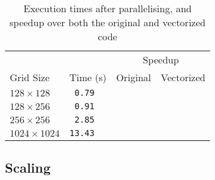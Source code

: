 \documentclass[11pt, twocolumn, a4paper]{article}
\begin{document}
\begin{table}[htbp]
  \begin{center}
  \caption{Execution times after parallelising, and speedup over both the original and vectorized code}\label{tab:parallelised}
  \begin{tabular}{l | l  l  l} 
      \hline\hline
      &&\multicolumn{2}{c}{Speedup}\\
      \cline{3-4}
      Grid Size&Time (s)&Original&Vectorized\\
      \hline
      $128 \times 128$&\texttt{ 0.79}&\texttt{}&\texttt{}\\
      $128 \times 256$&\texttt{ 0.91}&\texttt{}&\texttt{}\\
      $256 \times 256$&\texttt{ 2.85}&\texttt{}&\texttt{}\\
      $1024 \times 1024$&\texttt{13.43}&\texttt{}&\texttt{}\\
      \hline
    \end{tabular}
  \end{center}
\end{table}

\subsection{Scaling}

\clearpage

\onecolumn{
  \printbibliography
}
\end{document}
